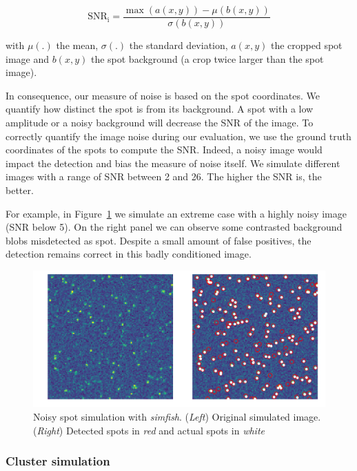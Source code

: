 \begin{equation}
	{\displaystyle \operatorname{SNR_i} = \frac{\max(a(x, y)) - \mu(b(x, y))}{\sigma(b(x, y))}}
\end{equation}

\noindent
with $\mu(.)$ the mean, $\sigma(.)$ the standard deviation, $a(x, y)$ the cropped spot image and $b(x, y)$ the spot background (a crop twice larger than the spot image).

In consequence, our measure of noise is based on the spot coordinates.
We quantify how distinct the spot is from its background.
A spot with a low amplitude or a noisy background will decrease the \ac{SNR} of the image.
To correctly quantify the image noise during our evaluation, we use the ground truth coordinates of the spots to compute the \ac{SNR}.
Indeed, a noisy image would impact the detection and bias the measure of noise itself.
We simulate different images with a range of \ac{SNR} between 2 and 26.
The higher the \ac{SNR} is, the better.

For example, in Figure~\ref{fig:spot_detection_high_noise} we simulate an extreme case with a highly noisy image (\ac{SNR} below 5).
On the right panel we can observe some contrasted background blobs misdetected as spot.
Despite a small amount of false positives, the detection remains correct in this badly conditioned image.

\begin{figure}[h]
    \centering
    \includegraphics[width=1\textwidth]{figures/chapter2/plot_spot_detection}
    \caption{Noisy spot simulation with \emph{simfish}.
	(\textit{Left}) Original simulated image.
	(\textit{Right}) Detected spots in \textit{red} and actual spots in \textit{white}}
    \label{fig:spot_detection_high_noise}
\end{figure}

\subsubsection{Cluster simulation}

